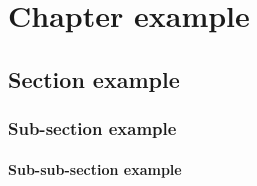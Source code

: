 \chapter{Chapter example}
    \section{Section example}
        \subsection{Sub-section example}
            \subsubsection{Sub-sub-section example}

